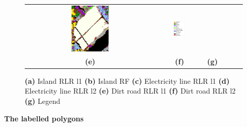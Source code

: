 \documentclass{siamart171218}
\begin{document}
\begin{figure} [H]
\begin{tabular}{cccccc}
        \includegraphics[width=0.3\textwidth]{images/field_lrl2.png} &
        \includegraphics[width=0.3\textwidth]{images/legend.png} \\
        \textbf{(e)}  & \textbf{(f)} & \textbf{(g)} \\[6pt]
    \end{tabular}
    \caption{ 
    \textbf{(a)} Island RLR l1
    \textbf{(b)} Island RF
    \textbf{(c)} Electricity line RLR l1
    \textbf{(d)} Electricity line RLR l2
    \textbf{(e)} Dirt road RLR l1
    \textbf{(f)} Dirt road RLR l2
    \textbf{(g)} Legend}
    \label{visual_assessment_kmeans_pictures2}
\end{figure}




\textbf{The labelled polygons}\\
\end{document}
